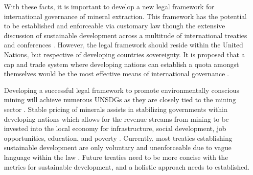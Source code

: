 \documentclass[12pt]{article}
\begin{document}
With these facts, it is important to develop a new legal framework for international governance of mineral extraction. This framework has the potential to be established and enforceable via customary law though the extensive discussion of sustainable development across a multitude of international treaties and conferences \cite{Article:Development_International_Law}. However, the legal framework should reside within the United Nations, but respective of developing countries sovereignty. It is proposed that a cap and trade system where developing nations can establish a quota amongst themselves would be the most effective means of international governance \cite{Book:Governance_Resources}. 

Developing a successful legal framework to promote environmentally conscious mining will achieve numerous UNSDGs as they are closely tied to the mining sector \cite{Book:MRG_Sustainable_Report}. Stable pricing of minerals assists in stabilizing governments within developing nations which allows for the revenue streams from mining to be invested into the local economy for infrastructure, social development, job opportunities, education, and poverty \cite{Book:Governance_Resources}. Currently, most treaties establishing sustainable development are only voluntary and unenforceable due to vague language within the law \cite{Article:Development_International_Law}. Future treaties need to be more concise with the metrics for sustainable development, and a holistic approach needs to established. 



\newpage
\printbibliography
\end{document}
